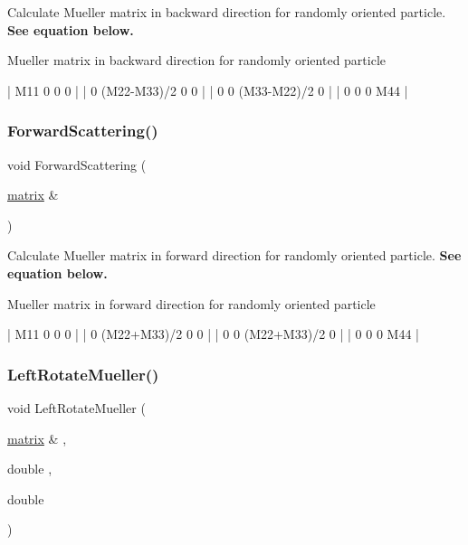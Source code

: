 Calculate Mueller matrix in backward direction for randomly oriented particle. {\bfseries See equation below. } 

Mueller matrix in backward direction for randomly oriented particle 
\begin{DoxyCode}
| M11    0           0           0   |
| 0      (M22-M33)/2 0           0   |
| 0      0           (M33-M22)/2 0   |
| 0      0           0           M44 |
\end{DoxyCode}
 \mbox{\label{group___ax_func_ga478ee7f889ff4d188e97822c4f495c41}} 
\subsubsection{\texorpdfstring{Forward\+Scattering()}{ForwardScattering()}}
{\footnotesize\ttfamily void Forward\+Scattering (\begin{DoxyParamCaption}\item[{\mbox{\hyperlink{classmatrix}{matrix}} \&}]{ }\end{DoxyParamCaption})}



Calculate Mueller matrix in forward direction for randomly oriented particle. {\bfseries See equation below.} 

Mueller matrix in forward direction for randomly oriented particle 
\begin{DoxyCode}
| M11    0           0           0   |
| 0      (M22+M33)/2 0           0   |
| 0      0           (M22+M33)/2 0   |
| 0      0           0           M44 |
\end{DoxyCode}
 \mbox{\label{group___ax_func_ga741a2cc01b63499350d7c4bd63b8e1bf}} 
\subsubsection{\texorpdfstring{Left\+Rotate\+Mueller()}{LeftRotateMueller()}}
{\footnotesize\ttfamily void Left\+Rotate\+Mueller (\begin{DoxyParamCaption}\item[{\mbox{\hyperlink{classmatrix}{matrix}} \&}]{,  }\item[{double}]{,  }\item[{double}]{ }\end{DoxyParamCaption})}



